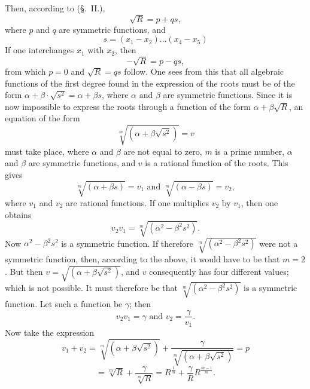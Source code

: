 \documentclass{article}
\begin{document}
Then, according to (§.~II.),
\[ \sqrt{R} = p + qs, \]
where $p$ and $q$ are symmetric functions, and
\[ s = (x_1 - x_2) \ldots (x_4 - x_5) \]
If one interchanges $x_1$ with $x_2$, then
\[ -\sqrt{R} = p - qs, \]
from which $p = 0$ and $\sqrt{R} = qs$ follow. One sees from this that all algebraic functions of the first degree found in the expression of the roots must be of the form $\alpha + \beta \cdot \sqrt{s^{2}} = \alpha + \beta s$, where $\alpha$ and $\beta$ are symmetric functions. Since it is now impossible to express the roots through a function of the form $\alpha + \beta \sqrt{R}$, an equation of the form
\[ \sqrt[m]{(\alpha + \beta \sqrt{s^{2}})} = v \]
must take place, where $\alpha$ and $\beta$ are not equal to zero, $m$ is a prime number, $\alpha$ and $\beta$ are symmetric functions, and $v$ is a rational function of the roots. This gives
\[ \sqrt[m]{(\alpha + \beta s)} = v_1 \text{ and } \sqrt[m]{(\alpha - \beta s)} = v_2, \]
where $v_1$ and $v_2$ are rational functions. If one multiplies $v_2$ by $v_1$, then one obtains
\[ v_2 v_1 = \sqrt[m]{(\alpha^{2} - \beta^{2} s^{2})}. \]
Now $\alpha^{2} - \beta^{2} s^{2}$ is a symmetric function. If therefore $\sqrt[m]{(\alpha^{2} - \beta^{2} s^{2})}$ were not a symmetric function, then, according to the above, it would have to be that $m = 2$. But then $v = \sqrt{(\alpha + \beta \sqrt{s^{2}})}$, and $v$ consequently has four different values; which is not possible. It must therefore be that $\sqrt[m]{(\alpha^{2} - \beta^{2} s^{2})}$ is a symmetric function. Let such a function be $\gamma$; then
\[ v_2 v_1 = \gamma \text{ and } v_2 = \frac{\gamma}{v_1}. \]
Now take the expression
\[ v_1 + v_2 = \sqrt[m]{(\alpha + \beta \sqrt{s^{2}})} + \frac{\gamma}{\sqrt[m]{(\alpha + \beta \sqrt{s^{2}})}} = p \]
\[ = \sqrt[m]{R} + \frac{\gamma}{\sqrt[m]{R}} = R^{\frac{1}{m}} + \frac{\gamma}{R} R^{\frac{m-1}{m}}. \]
\end{document}
